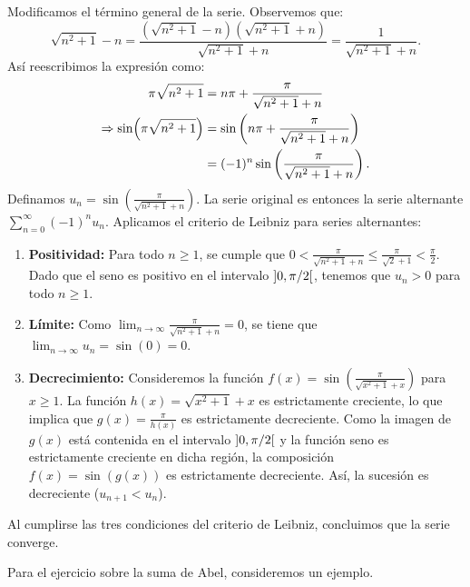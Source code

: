 \documentclass[12pt]{memoir}
\begin{document}
\begin{Ej}
    Modificamos el término general de la serie. Observemos que:
    \[
    \sqrt{n^2+1}-n = \frac{(\sqrt{n^2+1}-n)(\sqrt{n^2+1}+n)}{\sqrt{n^2+1}+n} = \frac{1}{\sqrt{n^2+1}+n}.
    \]
    Así reescribimos la expresión como:
    \begin{align*}
         \pi\sqrt{n^2+1} &= n\pi + \frac{\pi}{\sqrt{n^2+1}+n}\\
  \Rightarrow \sin(\pi\sqrt{n^2+1}) &= \sin\left(n\pi + \frac{\pi}{\sqrt{n^2+1}+n}\right)\\
   &= (-1)^n \sin\left(\frac{\pi}{\sqrt{n^2+1}+n}\right).
    \end{align*}
    Definamos \(u_n = \sin\left(\frac{\pi}{\sqrt{n^2+1}+n}\right)\). La serie original es entonces la serie alternante \(\sum_{n=0}^{\infty} (-1)^n u_n\). Aplicamos el criterio de Leibniz para series alternantes:
    \begin{enumerate}
        \item \textbf{Positividad:} Para todo \(n \geq 1\), se cumple que \(0 < \frac{\pi}{\sqrt{n^2+1}+n} \leq \frac{\pi}{\sqrt{2}+1} < \frac{\pi}{2}\). Dado que el seno es positivo en el intervalo \(\left\rbrack0, \pi/2\right\lbrack\), tenemos que \(u_n > 0\) para todo \(n \geq 1\).
        \item \textbf{Límite:} Como \(\lim_{n\to\infty} \frac{\pi}{\sqrt{n^2+1}+n} = 0\), se tiene que \(\lim_{n\to\infty} u_n = \sin(0) = 0\).
        \item \textbf{Decrecimiento:} Consideremos la función \(f(x) = \sin\left(\frac{\pi}{\sqrt{x^2+1}+x}\right)\) para \(x \geq 1\). La función \(h(x) = \sqrt{x^2+1}+x\) es estrictamente creciente, lo que implica que \(g(x) = \frac{\pi}{h(x)}\) es estrictamente decreciente. Como la imagen de \(g(x)\) está contenida en el intervalo \(\left\rbrack0, \pi/2\right\lbrack\) y la función seno es estrictamente creciente en dicha región, la composición \(f(x) = \sin(g(x))\) es estrictamente decreciente. Así, la sucesión es decreciente (\(u_{n+1} < u_n\)).
    \end{enumerate}
    Al cumplirse las tres condiciones del criterio de Leibniz, concluimos que la serie converge.
\end{Ej}

Para el ejercicio sobre la suma de Abel, consideremos un ejemplo.
\end{document}

